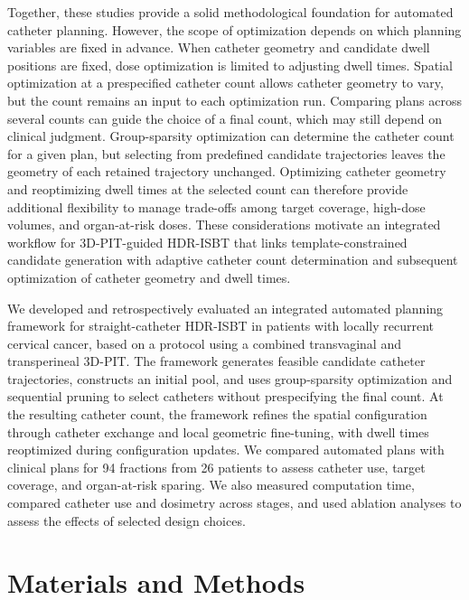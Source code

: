 \documentclass[12pt,twoside,letterpaper]{article}
\begin{document}
Together, these studies provide a solid methodological foundation for automated catheter planning. However, the scope of optimization depends on which planning variables are fixed in advance. When catheter geometry and candidate dwell positions are fixed, dose optimization is limited to adjusting dwell times.\cite{ref27,ref32} Spatial optimization at a prespecified catheter count allows catheter geometry to vary, but the count remains an input to each optimization run.\cite{ref25,ref55} Comparing plans across several counts can guide the choice of a final count, which may still depend on clinical judgment.\cite{ref74} Group-sparsity optimization can determine the catheter count for a given plan,\cite{ref70,ref73} but selecting from predefined candidate trajectories leaves the geometry of each retained trajectory unchanged.\cite{ref70,ref71} Optimizing catheter geometry and reoptimizing dwell times at the selected count can therefore provide additional flexibility to manage trade-offs among target coverage, high-dose volumes, and organ-at-risk doses.\cite{ref50,ref55,ref68} These considerations motivate an integrated workflow for 3D-PIT-guided HDR-ISBT that links template-constrained candidate generation with adaptive catheter count determination and subsequent optimization of catheter geometry and dwell times.

We developed and retrospectively evaluated an integrated automated planning framework for straight-catheter HDR-ISBT in patients with locally recurrent cervical cancer, based on a protocol using a combined transvaginal and transperineal 3D-PIT.\cite{ref20,ref21} The framework generates feasible candidate catheter trajectories, constructs an initial pool, and uses group-sparsity optimization and sequential pruning to select catheters without prespecifying the final count. At the resulting catheter count, the framework refines the spatial configuration through catheter exchange and local geometric fine-tuning, with dwell times reoptimized during configuration updates. We compared automated plans with clinical plans for 94 fractions from 26 patients to assess catheter use, target coverage, and organ-at-risk sparing. We also measured computation time, compared catheter use and dosimetry across stages, and used ablation analyses to assess the effects of selected design choices.

\section{Materials and Methods}\label{sec:2}
\end{document}
